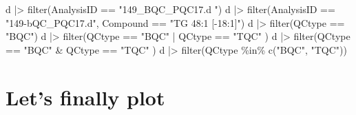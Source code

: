 \documentclass[
  letterpaper,
  DIV=11,
  numbers=noendperiod]{scrreprt}
\newenvironment{Shaded}{\begin{snugshade}}{\end{snugshade}}
\newcommand{\AttributeTok}[1]{\textcolor[rgb]{0.40,0.45,0.13}{#1}}
\newcommand{\CommentTok}[1]{\textcolor[rgb]{0.37,0.37,0.37}{#1}}
\newcommand{\DecValTok}[1]{\textcolor[rgb]{0.68,0.00,0.00}{#1}}
\newcommand{\FunctionTok}[1]{\textcolor[rgb]{0.28,0.35,0.67}{#1}}
\newcommand{\NormalTok}[1]{\textcolor[rgb]{0.00,0.23,0.31}{#1}}
\newcommand{\OtherTok}[1]{\textcolor[rgb]{0.00,0.23,0.31}{#1}}
\newcommand{\SpecialCharTok}[1]{\textcolor[rgb]{0.37,0.37,0.37}{#1}}
\newcommand{\StringTok}[1]{\textcolor[rgb]{0.13,0.47,0.30}{#1}}
\begin{document}
\begin{Shaded}
\begin{Highlighting}[]
\NormalTok{d }\SpecialCharTok{|\textgreater{}} \FunctionTok{filter}\NormalTok{(AnalysisID }\SpecialCharTok{==} \StringTok{"149\_BQC\_PQC17.d "}\NormalTok{)}
\NormalTok{d }\SpecialCharTok{|\textgreater{}} \FunctionTok{filter}\NormalTok{(AnalysisID }\SpecialCharTok{==} \StringTok{"149{-}bQC\_PQC17.d"}\NormalTok{, Compound }\SpecialCharTok{==} \StringTok{"TG 48:1 [{-}18:1]"}\NormalTok{)}
\NormalTok{d }\SpecialCharTok{|\textgreater{}} \FunctionTok{filter}\NormalTok{(QCtype }\SpecialCharTok{==} \StringTok{"BQC"}\NormalTok{)}
\NormalTok{d }\SpecialCharTok{|\textgreater{}} \FunctionTok{filter}\NormalTok{(QCtype }\SpecialCharTok{==} \StringTok{"BQC"} \SpecialCharTok{|}\NormalTok{ QCtype }\SpecialCharTok{==} \StringTok{"TQC"}\NormalTok{ )}
\NormalTok{d }\SpecialCharTok{|\textgreater{}} \FunctionTok{filter}\NormalTok{(QCtype }\SpecialCharTok{==} \StringTok{"BQC"} \SpecialCharTok{\&}\NormalTok{ QCtype }\SpecialCharTok{==} \StringTok{"TQC"}\NormalTok{ )}
\NormalTok{d }\SpecialCharTok{|\textgreater{}} \FunctionTok{filter}\NormalTok{(QCtype }\SpecialCharTok{\%in\%} \FunctionTok{c}\NormalTok{(}\StringTok{"BQC"}\NormalTok{, }\StringTok{"TQC"}\NormalTok{))}
\end{Highlighting}
\end{Shaded}

\hypertarget{lets-finally-plot}{%
\section{Let's finally plot}\label{lets-finally-plot}}

\begin{Shaded}
\end{Shaded}
\end{document}
